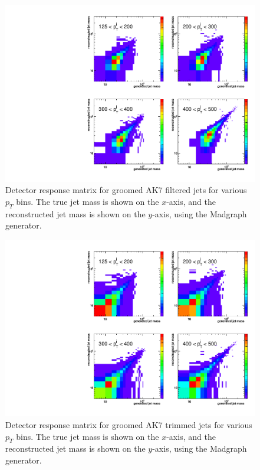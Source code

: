\begin{figure}[!htb]
\centering
\includegraphics[width=1.0\textwidth]{figs/unf_response_ak7ft_pTbins.pdf}
\caption{Detector response matrix for groomed AK7 filtered jets for various $p_T$ bins. The true jet 
mass is shown on the $x$-axis, and the reconstructed jet mass is shown on the $y$-axis, using the Madgraph generator.}
\label{figs:unfo2d_3}
\end{figure}

\begin{figure}[!htb]
\centering
\includegraphics[width=1.0\textwidth]{figs/unf_response_ak7tr_pTbins.pdf}
\caption{Detector response matrix for groomed AK7 trimmed jets for various $p_T$ bins. The true jet 
mass is shown on the $x$-axis, and the reconstructed jet mass is shown on the $y$-axis, using the Madgraph generator.}
\label{figs:unfo2d_4}
\end{figure}



